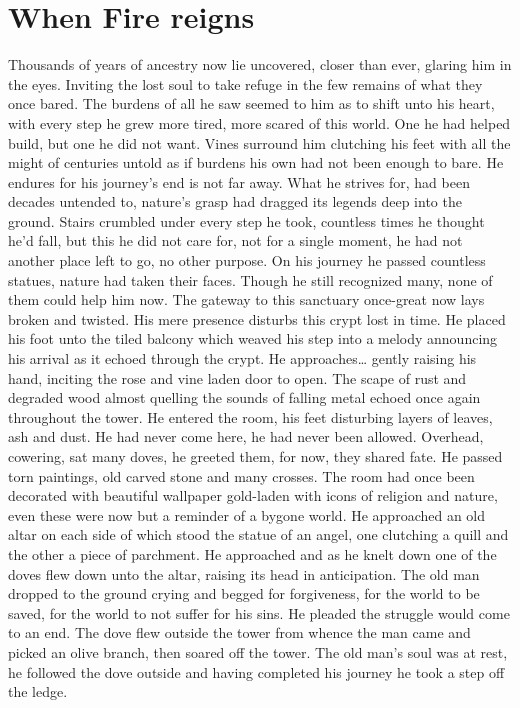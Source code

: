 \chapter{When Fire reigns}

Thousands of years of ancestry now lie uncovered, closer than ever,
glaring him in the eyes. Inviting the lost soul to take refuge in the
few remains of what they once bared. The burdens of all he saw seemed to
him as to shift unto his heart, with every step he grew more tired, more
scared of this world. One he had helped build, but one he did not want.
Vines surround him clutching his feet with all the might of centuries
untold as if burdens his own had not been enough to bare. He endures for
his journey's end is not far away. What he strives for, had been decades
untended to, nature's grasp had dragged its legends deep into the
ground. Stairs crumbled under every step he took, countless times he
thought he'd fall, but this he did not care for, not for a single
moment, he had not another place left to go, no other purpose. On his
journey he passed countless statues, nature had taken their faces.
Though he still recognized many, none of them could help him now. The
gateway to this sanctuary once-great now lays broken and twisted. His
mere presence disturbs this crypt lost in time. He placed his foot unto
the tiled balcony which weaved his step into a melody announcing his
arrival as it echoed through the crypt. He approaches\ldots{} gently
raising his hand, inciting the rose and vine laden door to open. The
scape of rust and degraded wood almost quelling the sounds of falling
metal echoed once again throughout the tower. He entered the room, his
feet disturbing layers of leaves, ash and dust. He had never come here,
he had never been allowed. Overhead, cowering, sat many doves, he
greeted them, for now, they shared fate. He passed torn paintings, old
carved stone and many crosses. The room had once been decorated with
beautiful wallpaper gold-laden with icons of religion and nature, even
these were now but a reminder of a bygone world. He approached an old
altar on each side of which stood the statue of an angel, one clutching
a quill and the other a piece of parchment. He approached and as he
knelt down one of the doves flew down unto the altar, raising its head
in anticipation. The old man dropped to the ground crying and begged for
forgiveness, for the world to be saved, for the world to not suffer for
his sins. He pleaded the struggle would come to an end. The dove flew
outside the tower from whence the man came and picked an olive branch,
then soared off the tower. The old man's soul was at rest, he followed
the dove outside and having completed his journey he took a step off the
ledge.
